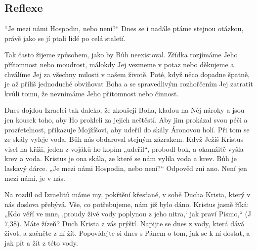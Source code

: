 \documentclass[11pt]{article}
\begin{document}
\subsection*{Reflexe}
“Je mezi námi Hospodin, nebo není?“ Dnes se i nadále ptáme stejnou otázkou, právě jako se jí ptali lidé po celá staletí.

Tak často žijeme způsobem, jako by Bůh neexistoval. Zřídka rozjímáme Jeho přítomnost nebo moudrost, málokdy Jej
vezmeme v potaz nebo děkujeme a chválíme Jej za všechny milosti v našem životě. Poté, když něco dopadne špatně, je
až příliš jednoduché obviňovat Boha a se spravedlivým rozhořčením Jej zatratit kvůli tomu, že nevnímáme Jeho
přítomnost nebo činnost.

Dnes dojdou Izraelci tak daleko, že zkoušejí Boha, kladou na Něj nároky a jsou jen kousek toho, aby Ho prokleli za
jejich neštěstí. Aby jim prokázal svou péči a prozřetelnost, přikazuje Mojžíšovi, aby udeřil do skály Áronovou holí. Při
tom se ze skály vyleje voda. Bůh nás obdaroval stejným zázrakem. Když Ježíš Kristus visel na kříži, jeden z vojáků ho
kopím „udeřil“, probodl bok, a okamžitě vyšla krev a voda. Kristus je ona skála, ze které se nám vylila voda a krev.
Bůh je laskavý dárce. „Je mezi námi Hospodin, nebo není?“ Odpověď zní ano. Není jen mezi námi, je v nás.

Na rozdíl od Izraelitů máme my, pokřtění křesťané, v sobě Ducha Krista, který v nás doslova přebývá. Vše, co
potřebujeme, nám již bylo dáno. Kristus jasně říká: „Kdo věří ve mne, ‚proudy živé vody poplynou z jeho nitra,‘ jak
praví Písmo,“ (J 7,38). Máte žízeň? Duch Krista z vás prýští. Napijte se dnes z vody, která dává život, a začněte z ní
žít. Popovídejte si dnes s Pánem o tom, jak se k ní dostat, a jak pít a žít z této vody.
\end{document}
